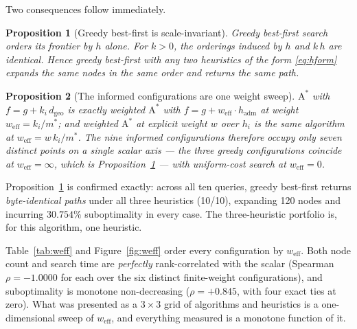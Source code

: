 \documentclass[11pt]{article}
\newtheorem{proposition}{Proposition}
\newcommand{\weff}{w_{\mathrm{eff}}}
\newcommand{\dgeo}{d_{\mathrm{geo}}}
\begin{document}
Two consequences follow immediately.

\begin{proposition}[Greedy best-first is scale-invariant]
\label{prop:greedy}
Greedy best-first search orders its frontier by $h$ alone. For $k > 0$, the orderings induced by
$h$ and $k\,h$ are identical. Hence greedy best-first with any two heuristics of the form
\eqref{eq:hform} expands the same nodes in the same order and returns the same path.
\end{proposition}

\begin{proposition}[The informed configurations are one weight sweep]
\label{prop:weight}
$\mathrm{A}^*$ with $f = g + k_i\,\dgeo$ is exactly weighted $\mathrm{A}^*$
\citep{pohl1970heuristic} with $f = g + \weff \cdot h_{\text{adm}}$ at weight
$\weff = k_i / m^{*}$; and weighted $\mathrm{A}^*$ at explicit weight $w$ over $h_i$ is the same
algorithm at $\weff = w\,k_i/m^{*}$. The nine informed configurations therefore occupy only
\emph{seven} distinct points on a single scalar axis --- the three greedy configurations coincide at
$\weff = \infty$, which is Proposition~\ref{prop:greedy} --- with uniform-cost search at
$\weff = 0$.
\end{proposition}

Proposition~\ref{prop:greedy} is confirmed exactly: across all ten queries, greedy best-first
returns \emph{byte-identical paths} under all three heuristics (10/10), expanding 120 nodes and
incurring $30.754\%$ suboptimality in every case. The three-heuristic portfolio is, for this
algorithm, one heuristic.

Table~\ref{tab:weff} and Figure~\ref{fig:weff} order every configuration by $\weff$. Both node
count and search time are
\emph{perfectly} rank-correlated with the scalar (Spearman $\rho = -1.0000$ for each over the six
distinct finite-weight configurations), and suboptimality is monotone non-decreasing
($\rho = +0.845$, with four exact ties at zero). What was presented as a $3 \times 3$ grid of
algorithms and heuristics is a one-dimensional sweep of $\weff$, and everything measured is a
monotone function of it.
\end{document}
